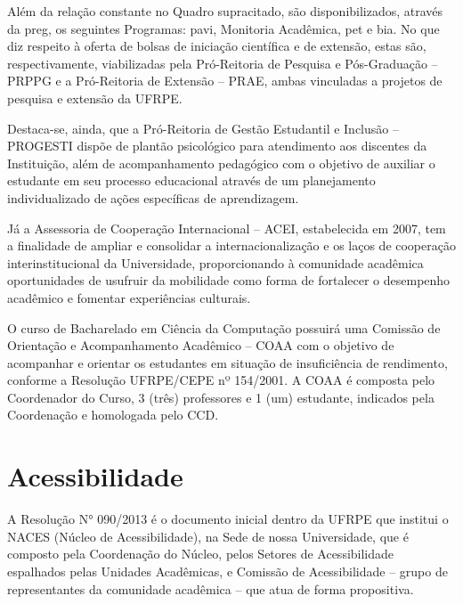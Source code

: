 \documentclass[
	12pt,				%
	openright,			%
  oneside,     %
	a4paper,			%
 hyphens,
	chapter=TITLE,		%
	english,			%
	french,				%
	spanish,			%
	brazil				%
	]{abntex2}
\begin{document}
Além da relação constante no Quadro supracitado, são disponibilizados, através da \acrshort{preg}, os seguintes Programas: \acrfull{pavi}, Monitoria Acadêmica, \acrshort{pet} e \acrfull{bia}. No que diz respeito à oferta de bolsas de iniciação científica e de extensão, estas são, respectivamente, viabilizadas pela Pró-Reitoria de Pesquisa e Pós-Graduação – PRPPG e a Pró-Reitoria de Extensão – PRAE, ambas vinculadas a projetos de pesquisa e extensão da UFRPE.

Destaca-se, ainda, que a Pró-Reitoria de Gestão Estudantil e Inclusão – PROGESTI dispõe de plantão psicológico para atendimento aos discentes da Instituição, além de acompanhamento pedagógico com o objetivo de auxiliar o estudante em seu processo educacional através de um planejamento individualizado de ações específicas de aprendizagem.

Já a Assessoria de Cooperação Internacional – ACEI, estabelecida em 2007, tem a finalidade de ampliar e consolidar a internacionalização e os laços de cooperação interinstitucional da Universidade, proporcionando à comunidade acadêmica oportunidades de usufruir da mobilidade como forma de fortalecer o desempenho acadêmico e fomentar experiências culturais.

O curso de Bacharelado em Ciência da Computação possuirá uma Comissão de Orientação e Acompanhamento Acadêmico – COAA com o objetivo de acompanhar e orientar os estudantes em situação de insuficiência de rendimento, conforme a Resolução UFRPE/CEPE nº 154/2001. A COAA é composta pelo Coordenador do Curso, 3 (três) professores e 1 (um) estudante, indicados pela Coordenação e homologada pelo CCD. 






%
%


\chapter{Acessibilidade}
\label{cap_acessibilidade}

A Resolução N° 090/2013 é o documento inicial dentro da UFRPE que institui o NACES (Núcleo de Acessibilidade), na Sede de nossa Universidade, que é composto pela Coordenação do Núcleo, pelos Setores de Acessibilidade espalhados pelas Unidades Acadêmicas, e Comissão de Acessibilidade – grupo de representantes da comunidade acadêmica – que atua de forma propositiva.
\end{document}
